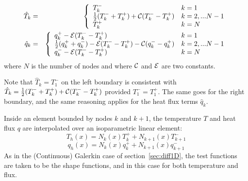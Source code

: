 \begin{eqnarray}
\hat{T}_k &=&
\left\{
\begin{array}{ll}
T_k^-   & k=1 \\ 
\frac{1}{2}(T_k^-+T_k^+) + {\cal C} (T_k^- - T_k^+) & k=2,...N-1\\
T_k^+    & k=N \\ 
\end{array}
\right. \nonumber\\
\hat{q}_k &=&
\left\{
\begin{array}{ll}
q_k^+ -{\cal E} (T_k^--T_k^+)  & k=1 \\ 
\frac{1}{2}(q_k^+ + q_k^-) - {\cal E} (T_k^- - T_k^+) - {\cal C}(q_k^- - q_k^+) & k=2,...N-1\\
q_k^- -{\cal E} (T_k^--T_k^+)    & k=N \\ 
\end{array}
\right.
\end{eqnarray}
where $N$ is the number of nodes and where ${\cal C}$ and ${\cal E}$ are two constants. 

\begin{remark}
Note that $\hat{T}_k=T_1^-$ on the left boundary is consistent with 
$\hat{T}_k=\frac{1}{2}(T_k^-+T_k^+) + {\cal C} (T_k^- - T_k^+)$ provided $T_1^-=T_1^+$.
The same goes for the right boundary, and the same reasoning applies for the heat flux terms $\hat{q}_k$. 
\end{remark}

Inside an element bounded by nodes $k$ and $k+1$, 
the temperature $T$ and heat flux $q$ are interpolated over an isoparametric linear element:
\[
T_h(x) = N_k(x) T_k^+ + N_{k+1}(x)T_{k+1}^-
\]
\[
q_h(x) = N_k(x) q_k^+ + N_{k+1}(x)q_{k+1}^-
\]
As in the (Continuous) Galerkin case of section~\ref{sec:diff1D}, the test functions are taken to 
be the shape functions, and in this case for both temperature and flux. 


